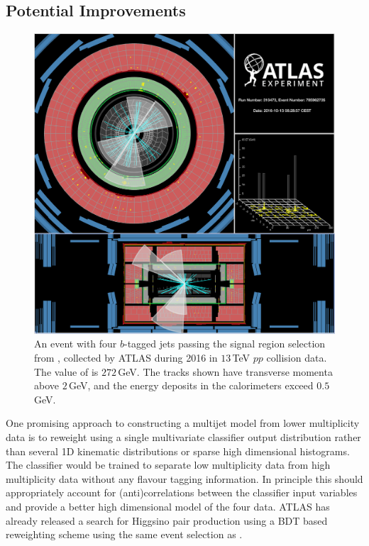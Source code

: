 \subsection{Potential Improvements}
\label{sec:improvements4b}

\begin{figure}
  \begin{center}
    \includegraphics[width=\linewidth]{figures/HH4b/272GeV.pdf}
    \caption{An event with four $b$-tagged jets passing the signal region selection from \cite{Aaboud:2018knk,Bryant:2644551},
      collected by ATLAS during 2016 in $13\,$TeV $pp$ collision data. The value of \mhh is $272\,$GeV.
      The tracks shown have transverse momenta above $2\,$GeV, and the energy deposits in the calorimeters exceed $0.5\,$GeV.}
    \label{fig:eventDisplay4b}
  \end{center}
\end{figure}

One promising approach to constructing a multijet model from lower \bjet multiplicity data is to reweight using a single multivariate classifier output distribution rather than several 1D kinematic distributions
or sparse high dimensional histograms.
The classifier would be trained to separate low \bjet multiplicity data from high \bjet multiplicity data without any flavour tagging information.
In principle this should appropriately account for (anti)correlations between the classifier input variables and provide a better high dimensional model of the four \bjet data.
ATLAS has already released a search for Higgsino pair production \cite{PhysRevD.98.092002} using a BDT based reweighting scheme using the same event selection as \cite{Aaboud:2018knk,Bryant:2644551}.

